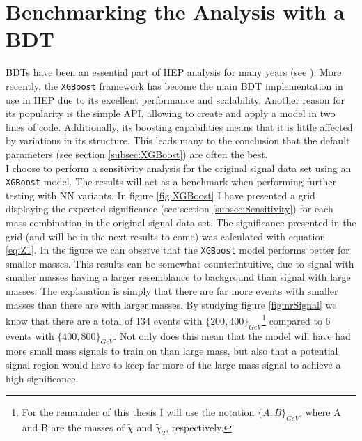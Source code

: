 \section{Benchmarking the Analysis with a BDT}\label{sec:XGBoost}
\ac{BDT}s have been an essential part of \acf{HEP} analysis for many years (see 
\cite{cms_collaboration_reconstruction_2016}). More recently, the \verb!XGBoost! 
framework has become the main \ac{BDT} implementation in use in \ac{HEP} due 
to its excellent performance and scalability. Another reason for its popularity is the simple \acf{API}, allowing 
to create and apply a model in two lines of code. Additionally, its boosting capabilities means 
that it is little affected by variations in its structure. This leads many to the conclusion that the default 
parameters (see section \ref{subsec:XGBoost}) are often the best. 
\\
I choose to perform a sensitivity analysis for the original signal data set using an \verb!XGBoost! model. The results
will act as a benchmark when performing further testing with \ac{NN} variants. In figure \ref{fig:XGBoost} 
I have presented a grid displaying the expected significance (see section \ref{subsec:Sensitivity}) for each 
mass combination in the original signal data set. The significance presented in the grid (and will be in the next results to come) 
was calculated with equation \ref{eq:Z1}. In the figure we can observe that the \verb!XGBoost! model performs
better for smaller masses. This results can be somewhat counterintuitive, due to signal with smaller masses 
having a larger resemblance to background than signal with large masses. The explanation is simply that there are
far more events with smaller masses than there are with larger masses. By studying figure \ref{fig:nrSignal} we know that 
there are a total of 134 events with $\{200,400\}_{GeV}$\footnote{For the remainder of this thesis I will use the notation $\{A,B\}_{GeV}$, 
where A and B are the masses of $\tilde{\chi}$ and $\tilde{\chi}_2$, respectively.} compared to 6 events 
with $\{400,800\}_{GeV}$. Not only does this mean that the model will have had more small mass signals to 
train on than large mass, but also that a potential signal region would have to keep far more of the large 
mass signal to achieve a high significance.\\
